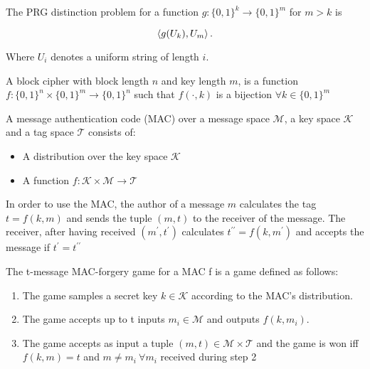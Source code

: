 \documentclass[a4paper,german]{article}
\newenvironment{customdef}[1]{\renewcommand\theinnercustomdef{#1}\innercustomdef}{\endinnercustomdef}
\begin{document}
\begin{customdef}{3.3}
	The PRG distinction problem for a function $g: \{0, 1\}^k \rightarrow \{0, 1\}^m$ for $m > k$ is

	\[
		\braket{g(U_k), U_m}
	.\]

	Where $U_i$ denotes a uniform string of length $i$.
\end{customdef}

\begin{customdef}{3.5}
	A block cipher with block length $n$ and key length $m$, is a function $f: \{0,1\}^n \times \{0,1\}^m \rightarrow \{0,1\}^n$ such that $f(\cdot, k)$ is a bijection $\forall k \in \{0,1\}^m$
\end{customdef}

\begin{customdef}{3.6}
	A message authentication code (MAC) over a message space $\mathcal{M}$, a key space $\mathcal{K}$ and a tag space $\mathcal{T}$ consists of:

	\begin{itemize}

		\item  A distribution over the key space $\mathcal{K}$
		\item  A function $f: \mathcal{K} \times \mathcal{M} \rightarrow \mathcal{T}$
	\end{itemize}

In order to use the MAC, the author of a message $m$ calculates the tag $t = f(k,m)$ and sends the tuple $(m, t)$ to the receiver of the message. The receiver, after having received $(m^\prime, t^\prime)$ calculates $t^{\prime\prime} = f(k, m^\prime)$ and accepts the message if $t^\prime = t^{\prime\prime}$
\end{customdef}

\begin{customdef}{3.7}
	The t-message MAC-forgery game for a MAC f is a game defined as follows:

	\begin{enumerate}

		\item  The game samples a secret key $k \in \mathcal{K}$ according to the MAC's distribution.
		\item  The game accepts up to t inputs $m_i \in \mathcal{M}$ and outputs $f(k, m_i)$.
		\item  The game accepts as input a tuple $(m, t) \in \mathcal{M \times T}$ and the game is won iff  $f(k, m) = t$ and $m \neq m_i ~ \forall m_i$ received during step 2

	\end{enumerate}
\end{customdef}
\end{document}
